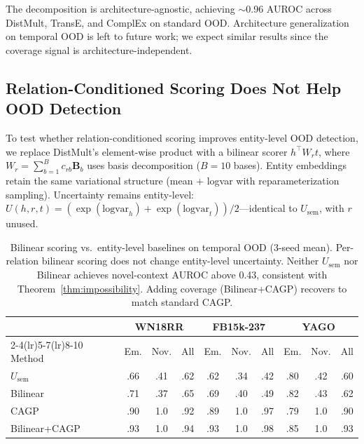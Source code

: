 \documentclass{article}
\begin{document}
The decomposition is architecture-agnostic, achieving $\sim$0.96 AUROC across DistMult, TransE, and ComplEx on standard OOD. Architecture generalization on temporal OOD is left to future work; we expect similar results since the coverage signal is architecture-independent.

\subsection{Relation-Conditioned Scoring Does Not Help OOD Detection}
\label{app:bilinear}

To test whether relation-conditioned scoring improves entity-level OOD detection, we replace DistMult's element-wise product with a bilinear scorer $h^\top W_r t$, where $W_r = \sum_{b=1}^{B} c_{rb} \mathbf{B}_b$ uses basis decomposition ($B{=}10$ bases). Entity embeddings retain the same variational structure (mean + logvar with reparameterization sampling). Uncertainty remains entity-level: $U(h,r,t) = (\exp(\text{logvar}_h) + \exp(\text{logvar}_t))/2$---identical to $U_{\text{sem}}$, with $r$ unused.

\begin{table}[ht]
\centering
\caption{Bilinear scoring vs.\ entity-level baselines on temporal OOD (3-seed mean). Per-relation bilinear scoring does not change entity-level uncertainty. Neither $U_{\text{sem}}$ nor Bilinear achieves novel-context AUROC above 0.43, consistent with Theorem~\ref{thm:impossibility}. Adding coverage (Bilinear+CAGP) recovers to match standard CAGP.}
\label{tab:bilinear}

\scriptsize
\setlength{\tabcolsep}{2pt}
\begin{tabular}{l ccc ccc ccc}
\toprule
 & \multicolumn{3}{c}{WN18RR} & \multicolumn{3}{c}{FB15k-237} & \multicolumn{3}{c}{YAGO} \\
\cmidrule(lr){2-4}\cmidrule(lr){5-7}\cmidrule(lr){8-10}
Method & Em. & Nov. & All & Em. & Nov. & All & Em. & Nov. & All \\
\midrule
$U_{\text{sem}}$ & .66 & .41 & .62 & .62 & .34 & .42 & .80 & .42 & .60 \\
Bilinear & .71 & .37 & .65 & .69 & .40 & .49 & .82 & .43 & .62 \\
\midrule
CAGP & .90 & 1.0 & .92 & .89 & 1.0 & .97 & .79 & 1.0 & .90 \\
Bilinear+CAGP & .93 & 1.0 & .94 & .93 & 1.0 & .98 & .85 & 1.0 & .93 \\
\bottomrule
\end{tabular}
\end{table}
\end{document}
